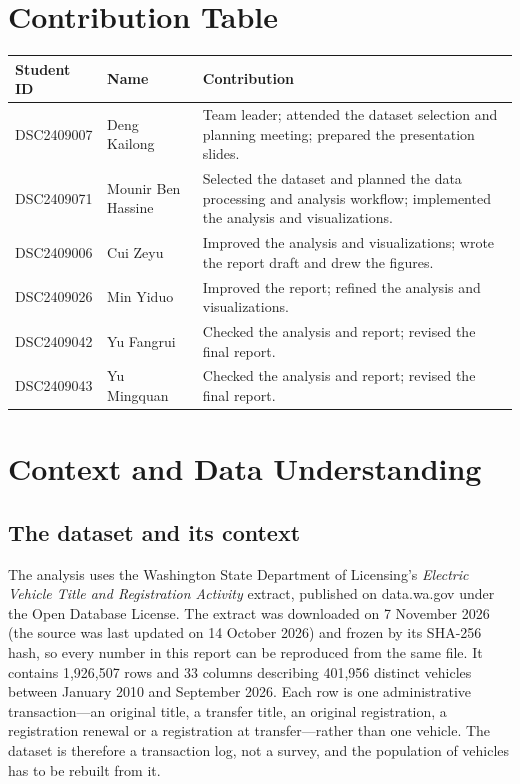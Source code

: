 \documentclass{xmum_asg}
\begin{document}
\section*{Contribution Table}
{\small
\begin{tabularx}{\textwidth}{|l|l|>{\raggedright\arraybackslash}X|}
\hline
\textbf{Student ID} & \textbf{Name} & \textbf{Contribution} \\
\hline
DSC2409007 & Deng Kailong & Team leader; attended the dataset selection and planning meeting; prepared the presentation slides. \\
\hline
DSC2409071 & Mounir Ben Hassine & Selected the dataset and planned the data processing and analysis workflow; implemented the analysis and visualizations. \\
\hline
DSC2409006 & Cui Zeyu & Improved the analysis and visualizations; wrote the report draft and drew the figures. \\
\hline
DSC2409026 & Min Yiduo & Improved the report; refined the analysis and visualizations. \\
\hline
DSC2409042 & Yu Fangrui & Checked the analysis and report; revised the final report. \\
\hline
DSC2409043 & Yu Mingquan & Checked the analysis and report; revised the final report. \\
\hline
\end{tabularx}
}

\clearpage
\tableofcontents
\clearpage
\pagestyle{fancy}
\setcounter{page}{1}

\section{Context and Data Understanding}

\subsection{The dataset and its context}

The analysis uses the Washington State Department of Licensing's \emph{Electric Vehicle Title and Registration Activity} extract, published on data.wa.gov under the Open Database License. The extract was downloaded on 7 November 2026 (the source was last updated on 14 October 2026) and frozen by its SHA-256 hash, so every number in this report can be reproduced from the same file. It contains 1,926,507 rows and 33 columns describing 401,956 distinct vehicles between January 2010 and September 2026. Each row is one administrative transaction---an original title, a transfer title, an original registration, a registration renewal or a registration at transfer---rather than one vehicle. The dataset is therefore a transaction log, not a survey, and the population of vehicles has to be rebuilt from it.
\end{document}
